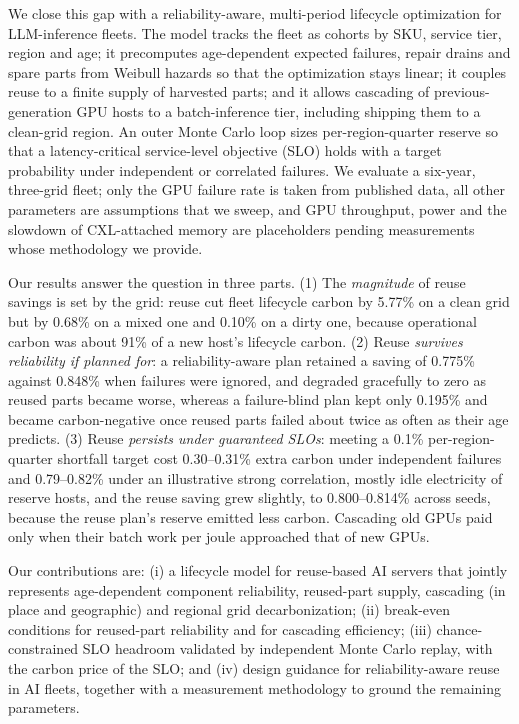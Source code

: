 \documentclass[11pt]{article}
\begin{document}
We close this gap with a reliability-aware, multi-period lifecycle optimization for LLM-inference fleets. The model tracks the fleet as cohorts by SKU, service tier, region and age; it precomputes age-dependent expected failures, repair drains and spare parts from Weibull hazards so that the optimization stays linear; it couples reuse to a finite supply of harvested parts; and it allows cascading of previous-generation GPU hosts to a batch-inference tier, including shipping them to a clean-grid region. An outer Monte Carlo loop sizes per-region-quarter reserve so that a latency-critical service-level objective (SLO) holds with a target probability under independent or correlated failures. We evaluate a six-year, three-grid fleet; only the GPU failure rate is taken from published data, all other parameters are assumptions that we sweep, and GPU throughput, power and the slowdown of CXL-attached memory are placeholders pending measurements whose methodology we provide.

Our results answer the question in three parts. (1) The \emph{magnitude} of reuse savings is set by the grid: reuse cut fleet lifecycle carbon by 5.77\% on a clean grid but by 0.68\% on a mixed one and 0.10\% on a dirty one, because operational carbon was about 91\% of a new host's lifecycle carbon. (2) Reuse \emph{survives reliability if planned for}: a reliability-aware plan retained a saving of 0.775\% against 0.848\% when failures were ignored, and degraded gracefully to zero as reused parts became worse, whereas a failure-blind plan kept only 0.195\% and became carbon-negative once reused parts failed about twice as often as their age predicts. (3) Reuse \emph{persists under guaranteed SLOs}: meeting a 0.1\% per-region-quarter shortfall target cost 0.30--0.31\% extra carbon under independent failures and 0.79--0.82\% under an illustrative strong correlation, mostly idle electricity of reserve hosts, and the reuse saving grew slightly, to 0.800--0.814\% across seeds, because the reuse plan's reserve emitted less carbon. Cascading old GPUs paid only when their batch work per joule approached that of new GPUs.

Our contributions are: (i) a lifecycle model for reuse-based AI servers that jointly represents age-dependent component reliability, reused-part supply, cascading (in place and geographic) and regional grid decarbonization; (ii) break-even conditions for reused-part reliability and for cascading efficiency; (iii) chance-constrained SLO headroom validated by independent Monte Carlo replay, with the carbon price of the SLO; and (iv) design guidance for reliability-aware reuse in AI fleets, together with a measurement methodology to ground the remaining parameters.
\end{document}
